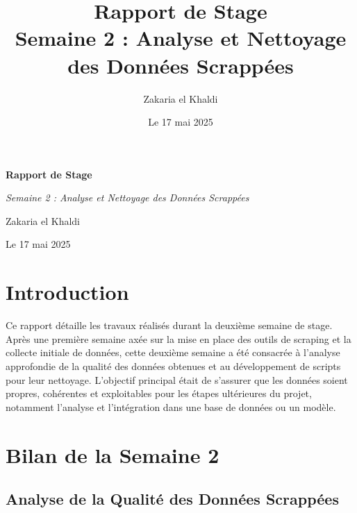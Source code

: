 \documentclass[12pt, a4paper]{article}
\title{\Huge\bfseries\color{primary} Rapport de Stage \\ 
      \Large Semaine 2 : Analyse et Nettoyage des Données Scrappées}
\author{\Large Zakaria el Khaldi}
\date{\large Le 17 mai 2025} %
\begin{document}
\begin{titlepage}
  \centering
  {\Huge\bfseries\color{primary} Rapport de Stage \par}
  \vspace{1cm}
  {\Large\itshape Semaine 2 : Analyse et Nettoyage des Données Scrappées\par} %
  \vspace{2cm}
  
  \vspace{2cm}
  {\Large Zakaria el Khaldi\par}
  \vfill
  {\large Le 17 mai 2025\par} %
\end{titlepage}

\tableofcontents
\thispagestyle{empty}
\newpage

\section{Introduction}
\thispagestyle{fancy}
Ce rapport détaille les travaux réalisés durant la deuxième semaine de stage. Après une première semaine axée sur la mise en place des outils de scraping et la collecte initiale de données, cette deuxième semaine a été consacrée à l'analyse approfondie de la qualité des données obtenues et au développement de scripts pour leur nettoyage. L'objectif principal était de s'assurer que les données soient propres, cohérentes et exploitables pour les étapes ultérieures du projet, notamment l'analyse et l'intégration dans une base de données ou un modèle.

\section{Bilan de la Semaine 2}

\subsection{Analyse de la Qualité des Données Scrappées}
\end{document}
